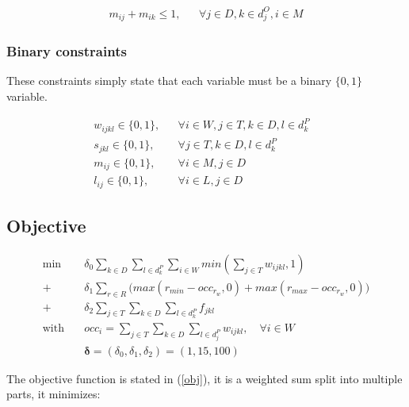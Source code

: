 \documentclass[../../thesis.tex]{subfiles}
\begin{document}
\begin{align}
  m_{ij} + m_{ik} \leq 1, && \forall j \in D, k \in d^O_j, i \in M  
\end{align}


\subsubsection{Binary constraints}

These constraints simply state that each variable must be a binary $\{ 0, 1 \}$ variable.

\begin{align}
  w_{ijkl} \in \{0, 1\}, && \forall i \in W, j \in T, k \in D, l \in d^P_k &\label{binary1} \\
  s_{jkl} \in \{0, 1\}, && \forall j \in T, k \in D, l \in d^P_k& \label{binary2} \\
  m_{ij} \in \{0, 1\}, && \forall i \in M, j \in D& \label{binary3} \\ 
  l_{ij} \in \{0, 1\}, && \forall i \in L, j \in D& \label{binary4} 
\end{align}




\subsection{Objective}


\begingroup
\allowdisplaybreaks
\begin{subequations}
  \label{obj}
  \begin{align}
    \textrm{min} \quad & \delta_0 \sum_{k \in D} \sum_{l \in d^P_k} \sum_{i \in W} min(\sum_{j \in T} w_{ijkl}, 1) \label{obj:1} \\ 
      + \ & \delta_1 \sum_{r \in R} \big( max(r_{min} - occ_{r_{w}}, 0) + max(r_{max} - occ_{r_{w}}, 0) \big)  \label{obj:3} \\ 
      + \ &\delta_2 \sum_{j \in T}\sum_{k\in D}\sum_{l \in d^P_k} f_{jkl} \label{obj:2} \\ 
     \textrm{with} \quad & occ_i = \sum_{j \in T} \sum_{k \in D} \sum_{l \in d^P_j} w_{ijkl}, \quad \forall i \in W  \nonumber \\ 
                         & \bm{\delta} = (\delta_0, \delta_1, \delta_2) = (1, 15, 100) \nonumber
  \end{align}
\end{subequations}
\endgroup


The objective function is stated in (\ref{obj}), it is a weighted sum split into multiple parts, it minimizes:
\end{document}

